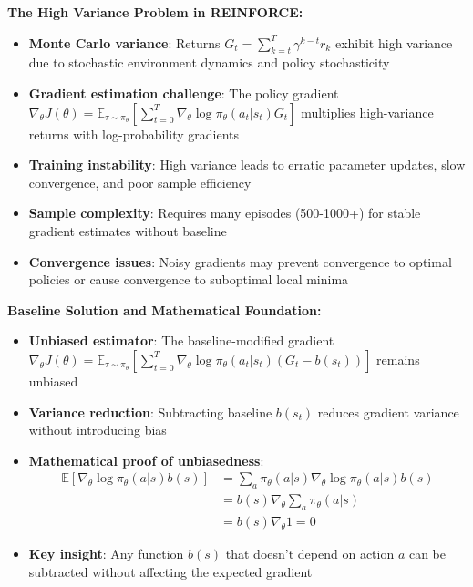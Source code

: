 \documentclass[12pt]{article}
\begin{document}
{{{\textbf{The High Variance Problem in REINFORCE:}
\begin{itemize}
    \item \textbf{Monte Carlo variance}: Returns $G_t = \sum_{k=t}^{T} \gamma^{k-t} r_k$ exhibit high variance due to stochastic environment dynamics and policy stochasticity
    \item \textbf{Gradient estimation challenge}: The policy gradient $\nabla_\theta J(\theta) = \mathbb{E}_{\tau \sim \pi_\theta}[\sum_{t=0}^{T} \nabla_\theta \log \pi_\theta(a_t|s_t) G_t]$ multiplies high-variance returns with log-probability gradients
    \item \textbf{Training instability}: High variance leads to erratic parameter updates, slow convergence, and poor sample efficiency
    \item \textbf{Sample complexity}: Requires many episodes (500-1000+) for stable gradient estimates without baseline
    \item \textbf{Convergence issues}: Noisy gradients may prevent convergence to optimal policies or cause convergence to suboptimal local minima
\end{itemize}

\textbf{Baseline Solution and Mathematical Foundation:}
\begin{itemize}
    \item \textbf{Unbiased estimator}: The baseline-modified gradient $\nabla_\theta J(\theta) = \mathbb{E}_{\tau \sim \pi_\theta}[\sum_{t=0}^{T} \nabla_\theta \log \pi_\theta(a_t|s_t) (G_t - b(s_t))]$ remains unbiased
    \item \textbf{Variance reduction}: Subtracting baseline $b(s_t)$ reduces gradient variance without introducing bias
    \item \textbf{Mathematical proof of unbiasedness}:
    \begin{align}
    \mathbb{E}[\nabla_\theta \log \pi_\theta(a|s) b(s)] &= \sum_a \pi_\theta(a|s) \nabla_\theta \log \pi_\theta(a|s) b(s) \\
    &= b(s) \nabla_\theta \sum_a \pi_\theta(a|s) \\
    &= b(s) \nabla_\theta 1 = 0
    \end{align}
    \item \textbf{Key insight}: Any function $b(s)$ that doesn't depend on action $a$ can be subtracted without affecting the expected gradient
\end{itemize}

}}}
\end{document}
